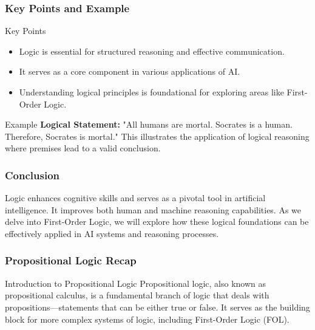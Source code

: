 \documentclass[aspectratio=169]{beamer}
\begin{document}
\begin{frame}[fragile]
    \frametitle{Key Points and Example}
    \begin{block}{Key Points}
        \begin{itemize}
            \item Logic is essential for structured reasoning and effective communication.
            \item It serves as a core component in various applications of AI.
            \item Understanding logical principles is foundational for exploring areas like First-Order Logic.
        \end{itemize}
    \end{block}

    \begin{block}{Example}
        \textbf{Logical Statement:} "All humans are mortal. Socrates is a human. 
        Therefore, Socrates is mortal." 
        This illustrates the application of logical reasoning where premises lead to a valid conclusion.
    \end{block}
\end{frame}

\begin{frame}[fragile]
    \frametitle{Conclusion}
    Logic enhances cognitive skills and serves as a pivotal tool in artificial intelligence. 
    It improves both human and machine reasoning capabilities. As we delve into 
    First-Order Logic, we will explore how these logical foundations can be effectively 
    applied in AI systems and reasoning processes.
\end{frame}

\begin{frame}[fragile]
    \frametitle{Propositional Logic Recap}
    \begin{block}{Introduction to Propositional Logic}
        Propositional logic, also known as propositional calculus, is a fundamental branch of logic that deals with propositions—statements that can be either true or false. It serves as the building block for more complex systems of logic, including First-Order Logic (FOL).
    \end{block}
\end{frame}
\end{document}
